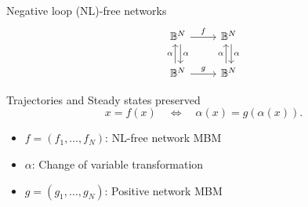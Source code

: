 \documentclass[aspectratio=169,9pt]{beamer}
\newcommand{\bbB}{\mathbb{B}}
\theoremstyle{definition}
\theoremstyle{remark}
\begin{document}
\begin{frame}[fragile]{Negative loop (NL)-free networks}
     \[
        \begin{tikzcd}
            \bbB^N \arrow[r, "f"] \arrow[d,"\alpha",shift left]
            & \bbB^N \arrow[d,"\alpha", shift left]\\
            \bbB^N \arrow[r, "g" ] \arrow[u,"\alpha", shift left]
            & \bbB^N \arrow[u,"\alpha", shift left] 
        \end{tikzcd}
    \]
    \pause 
    \vspace{0.25cm}
    
    Trajectories and Steady states preserved
    \[ x=f(x) \quad \Longleftrightarrow \quad \alpha(x) = g(\alpha(x)).\]
    \pause[1]
    \begin{itemize}
        \item $f=(f_1, \ldots, f_N)$: NL-free network MBM
        \item $\alpha$: Change of variable transformation 
        \item $g=(g_1, \ldots, g_N)$: Positive network MBM
    \end{itemize}
\end{frame}
\end{document}
